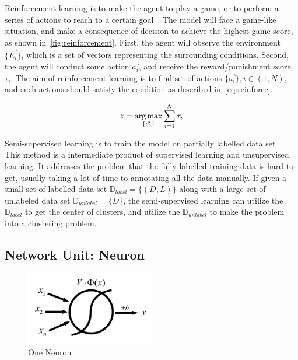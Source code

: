 \begin{spacing}{1.5}
Reinforcement learning is to make the agent to play a game, or to perform a series of actions to reach to a certain goal~\cite{barto2004reinforcement}. The model will face a game-like situation, and make a consequence of decision to achieve the highest game score, as shown in~\autoref{fig:reinforcement}. First, the agent will observe the environment $\{\vec{E_i}\}$, which is a set of vectors representing the surrounding conditions. Second, the agent will conduct some action $\vec{a_i}$, and receive the reward/punishment score $\tau_i$. The aim of reinforcement learning is to find set of actions $\{\vec{a_i}\}, i \in (1,N)$, and such actions should satisfy the condition as described in~\autoref{eq:reinforce}.

\begin{equation}
\label{eq:reinforce}
   z = \operatorname*{arg\,max}_{\{\vec{a_i}\}} \sum_{i=1}^{N} \tau_i
\end{equation}

Semi-supervised learning is to train the model on partially labelled data set~\cite{zhu2009introduction, zhu2005semi}. This method is a intermediate product of supervised learning and unsupervised learning. It addresses the problem that the fully labelled training data is hard to get, usually taking a lot of time to annotating all the data manually. If given a small set of labelled data set $\mathbb{D}_{label} = \{(D,L)\}$ along with a large set of unlabeled data set $\mathbb{D}_{unlabel} = \{D\}$, the semi-supervised learning can utilize the $\mathbb{D}_{label}$ to get the center of clusters, and utilize the $\mathbb{D}_{unlabel}$ to make the problem into a clustering problem.

\subsection{Network Unit: Neuron}
\label{subsec:neural_unit}

\begin{figure}[ht]
\centering
\includegraphics[width=0.5\textwidth, fbox]{Chapter2/neuralunit.pdf}
\caption{One Neuron}
\label{fig:neuralunit} 
\end{figure}


\end{spacing}
